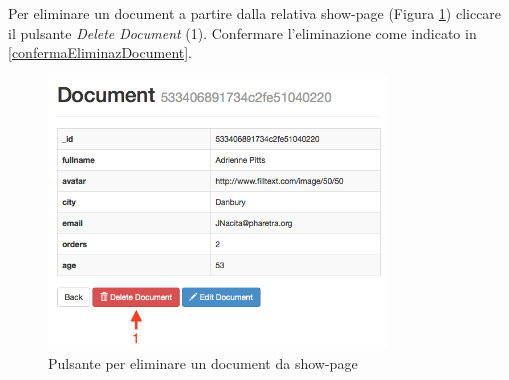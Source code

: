 			Per eliminare un document a partire dalla relativa show-page (Figura \ref{fig:eliminazionedocumentdashowpage}) cliccare il pulsante \emph{Delete Document} (1). Confermare l'eliminazione come indicato in \ref{confermaEliminazDocument}.

				\begin{figure}[H]
					\centering \includegraphics[width=0.8\textwidth]{img/eliminazionedocumentdashowpage.png}
				\caption{\label{fig:eliminazionedocumentdashowpage} Pulsante per eliminare un document da show-page}
				\end{figure}

